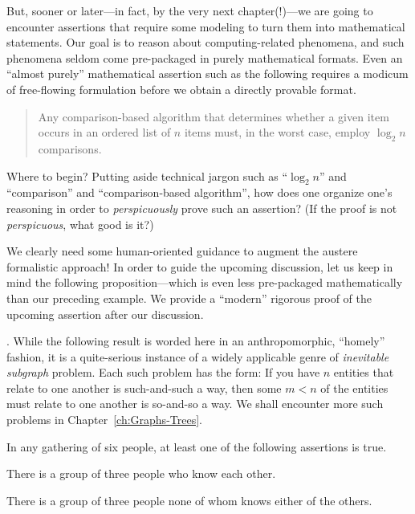 But, sooner or later---in fact, by the very next chapter(!)---we are
going to encounter assertions that require some modeling to turn them
into mathematical statements.  Our goal is to reason about
computing-related phenomena, and such phenomena seldom come
pre-packaged in purely mathematical formats.  Even an ``almost
purely'' mathematical assertion such as the following requires a
modicum of free-flowing formulation before we obtain a directly
provable format.
\begin{quote}
Any comparison-based algorithm that determines whether a given item
occurs in an ordered list of $n$ items must, in the worst case, employ
$\log_2 n$ comparisons.
\end{quote}
Where to begin? Putting aside technical jargon such as ``$\log_2 n$''
and ``comparison'' and ``comparison-based algorithm'', how does one
organize one's reasoning in order to {\em perspicuously} prove such an
assertion?  (If the proof is not {\em perspicuous}, what good is it?)

We clearly need some human-oriented guidance to augment the austere
formalistic approach!  In order to guide the upcoming discussion, let
us keep in mind the following proposition---which is even less
pre-packaged mathematically than our preceding example.  We provide a
``modern'' rigorous proof of the upcoming assertion after our
discussion.

\medskip

.
While the following result is worded here in an anthropomorphic,
``homely'' fashion, it is a quite-serious instance of a widely
applicable genre of {\it inevitable subgraph} problem.
 Each such problem has the form:
If you have $n$ entities that relate to one another is such-and-such a
way, then some $m < n$ of the entities must relate to one another is
so-and-so a way.  We shall encounter more such problems in
Chapter~\ref{ch:Graphs-Trees}.

\begin{prop}
\label{thm:triangle-cotriangles}
In any gathering of six people, at least one of the following
assertions is true.

There is a group of three people who know each other.

There is a group of three people none of whom knows either of the
others.
\end{prop}

